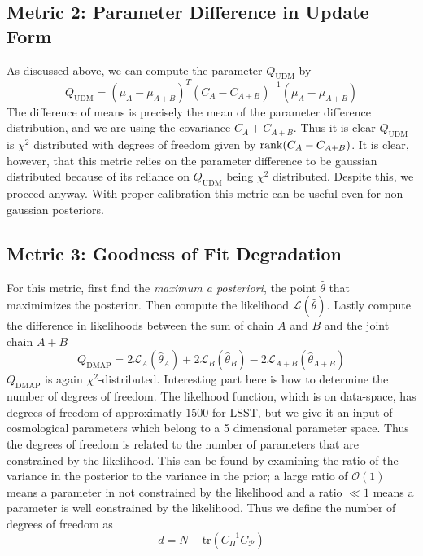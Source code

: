\subsection{Metric 2: Parameter Difference in Update Form}
As discussed above, we can compute the parameter $Q_{\mathrm{UDM}}$ by
\begin{equation}
    Q_{\mathrm{UDM}} = {(\mu_A - \mu_{A+B})}^T{(C_A-C_{A+B})}^{-1}(\mu_A - \mu_{A+B}) 
\end{equation}
The difference of means is precisely the mean of the parameter difference distribution, and we are using the covariance $C_A+C_{A+B}$.
Thus it is clear $Q_{\mathrm{UDM}}$ is $\chi^2$ distributed with degrees of freedom given by $\rank(C_A-C_{A+B})$. 
It is clear, however, that this metric relies on the parameter difference to be gaussian distributed because of its reliance on $Q_{\mathrm{UDM}}$ being $\chi^2$ distributed. Despite this, we proceed anyway. With proper calibration this metric can be useful even for non-gaussian posteriors.

\subsection{Metric 3: Goodness of Fit Degradation}
For this metric, first find the \textit{maximum a posteriori}, the point $\hat\theta$ that maximimizes the posterior. Then compute the likelihood $\mathcal{L}(\hat\theta)$. Lastly compute the difference in likelihoods between the sum of chain $A$ and $B$ and the joint chain $A+B$
\begin{equation}
	Q_{\mathrm{DMAP}} = 2\mathcal{L}_A(\hat\theta_A) + 2\mathcal{L}_B(\hat\theta_B) - 2\mathcal{L}_{A+B}(\hat\theta_{A+B})
\end{equation}
$Q_{\mathrm{DMAP}}$ is again $\chi^2$-distributed. Interesting part here is how to determine the number of degrees of freedom. The likelhood function, which is on data-space, has degrees of freedom of approximatly $1500$ for LSST, but we give it an input of cosmological parameters which belong to a 5 dimensional parameter space. Thus the degrees of freedom is related to the number of parameters that are constrained by the likelihood. This can be found by examining the ratio of the variance in the posterior to the variance in the prior; a large ratio of $\mathcal{O}(1)$ means a parameter in not constrained by the likelihood and a ratio $\ll 1$ means a parameter is well constrained by the likelihood. Thus we define the number of degrees of freedom as
\begin{equation}
	d = N-\mathrm{tr}(C_\Pi^{-1}C_\mathcal{P})
\end{equation}

